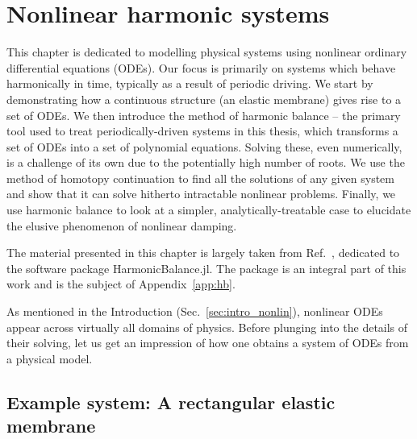 
\chapter{Nonlinear harmonic systems} \label{ch:hb}


\begin{chapterabstract}
	
This chapter is dedicated to modelling physical systems using nonlinear ordinary differential equations (ODEs). Our focus is primarily on systems which behave harmonically in time, typically as a result of periodic driving. We start by demonstrating how a continuous structure (an elastic membrane) gives rise to a set of ODEs. We then introduce the method of harmonic balance -- the primary tool used to treat periodically-driven systems in this thesis, which transforms a set of ODEs into a set of polynomial equations. Solving these, even numerically, is a challenge of its own due to the potentially high number of roots. We use the method of homotopy continuation to find all the solutions of any given system and show that it can solve hitherto intractable nonlinear problems. Finally, we use harmonic balance to look at a simpler, analytically-treatable case to elucidate the elusive phenomenon of nonlinear damping. 

%
\tcblower
%
The material presented in this chapter is largely taken from Ref.~\cite{Kosata_2022a}, dedicated to the software package HarmonicBalance.jl. The package is an integral part of this work and is the subject of Appendix~\ref{app:hb}.
\end{chapterabstract} 

As mentioned in the Introduction (Sec.~\ref{sec:intro_nonlin}), nonlinear ODEs appear across virtually all domains of physics. Before plunging into the details of their solving, let us get an impression of how one obtains a system of ODEs from a physical model.

\section{Example system: A rectangular elastic membrane} \label{sec:hb_membrane_eom}

